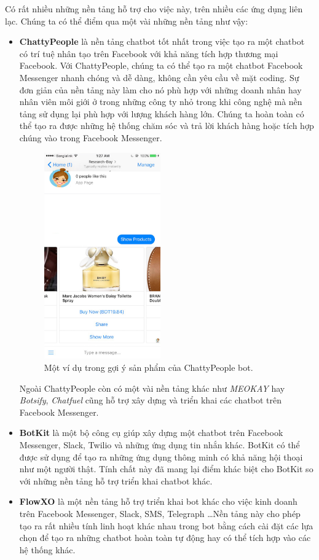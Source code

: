 \documentclass[12pt]{report}
\begin{document}
Có rất nhiều những nền tảng hỗ trợ cho việc này, trên nhiều các ứng dụng liên lạc. Chúng ta có thể điểm qua một vài những nền tảng như vậy:

\begin{itemize}
	\item \textbf{ChattyPeople} là nền tảng chatbot tốt nhất trong việc tạo ra một chatbot có trí tuệ nhân tạo trên Facebook với khả năng tích hợp thương mại Facebook. Với ChattyPeople, chúng ta có thể tạo ra một chatbot Facebook Messenger nhanh chóng và dễ dàng, không cần yêu cầu về mặt coding. Sự đơn giản của nền tảng này làm cho nó phù hợp với những doanh nhân hay nhân viên môi giới ở trong những công ty nhỏ trong khi công nghệ mà nền tảng sử dụng lại phù hợp với lượng khách hàng lớn. Chúng ta hoàn toàn có thể tạo ra được những hệ thống chăm sóc và trả lời khách hàng hoặc tích hợp chúng vào trong Facebook Messenger.

	\begin{figure}[H]
	  \centering
	    \includegraphics[width=5cm]{Pics/Chap2/chatty-prople.jpg}
	  \caption{Một ví dụ trong gợi ý sản phẩm của ChattyPeople bot\cite{chattypeople}.}
	\end{figure}

Ngoài ChattyPeople còn có một vài nền tảng khác như \textit{MEOKAY} hay \textit{Botsify}, \textit{Chatfuel} cũng hỗ trợ xây dựng và triển khai các chatbot trên Facebook Messenger.

	\item \textbf{BotKit} là một bộ công cụ giúp xây dựng một chatbot trên Facebook Messenger, Slack, Twilio và những ứng dụng tin nhắn khác. BotKit có thể được sử dụng để tạo ra những ứng dụng thông minh có khả năng hội thoại như một người thật. Tính chất này đã mang lại điểm khác biệt cho BotKit so với những nền tảng hỗ trợ triển khai chatbot khác\cite{botkit}.

	\item \textbf{FlowXO} là một nền tảng hỗ trợ triển khai bot khác cho việc kinh doanh trên Facebook Messenger, Slack, SMS, Telegraph \ldots Nền tảng này cho phép tạo ra rất nhiều tính linh hoạt khác nhau trong bot bằng cách cài đặt các lựa chọn để tạo ra những chatbot hoàn toàn tự động hay có thể tích hợp vào các hệ thống khác\cite{flowxo}.
\end{itemize}
\end{document}
